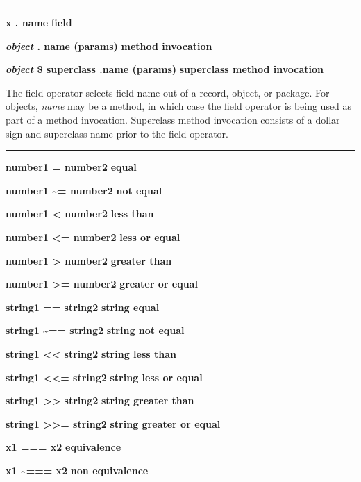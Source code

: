 \bigskip\hrule\vspace{0.1cm}

\noindent
{\bf x . name } \hfill {\bf field}

\noindent
{\bf \textit{object} . name (params) } \hfill {\bf method invocation}

\noindent
{\bf \textit{object} \$ superclass .name (params) } \hfill {\bf superclass method invocation}

\noindent
The field operator selects field name out of a record,
object, or package. For objects, \textit{name} may be a method, in
which case the field operator is being used as part of a method
invocation. Superclass method invocation consists of a dollar sign and
superclass name prior to the field operator.

\bigskip\hrule\vspace{0.1cm}
\noindent
{\bf number1 = number2 } \hfill {\bf equal}

\noindent
{}
{\bf number1 \~{}= number2 } \hfill {\bf not equal}

\noindent
{\bf number1 {\textless} number2 } \hfill {\bf less than}

\noindent
{\bf number1 {\textless}= number2 } \hfill {\bf less or equal}

\noindent
{\bf number1 {\textgreater} number2 } \hfill {\bf greater than}

\noindent
{\bf number1 {\textgreater}= number2 } \hfill {\bf greater or equal}

\noindent
{\bf string1 == string2 } \hfill {\bf string equal}

\noindent
{\bf string1 \~{}== string2 } \hfill {\bf string not equal}

\noindent
{\bf string1 {\textless}{\textless} string2 } \hfill {\bf string less than}

\noindent
{\bf string1 {\textless}{\textless}= string2 } \hfill {\bf string less or equal}

\noindent
{\bf string1 {\textgreater}{\textgreater} string2 } \hfill {\bf string greater than}

\noindent
{\bf string1 {\textgreater}{\textgreater}= string2 } \hfill {\bf string greater or equal}

\noindent
{\bf x1 === x2 } \hfill {\bf equivalence}

\noindent
{\bf x1 \~{}=== x2 } \hfill {\bf non equivalence}

